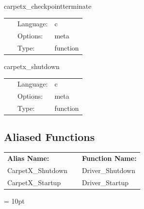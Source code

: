 \vspace{5mm}


\hspace{5mm} carpetx\_checkpointterminate 

\hspace{5mm}{\it checkpoint before terminating } 


\hspace{5mm}

 \begin{tabular*}{160mm}{cll} 
~ & Language:  & c \\ 
~ & Options:  & meta \\ 
~ & Type:  & function \\ 
\end{tabular*} 


\vspace{5mm}


\hspace{5mm} carpetx\_shutdown 

\hspace{5mm}{\it shut down the driver } 


\hspace{5mm}

 \begin{tabular*}{160mm}{cll} 
~ & Language:  & c \\ 
~ & Options:  & meta \\ 
~ & Type:  & function \\ 
\end{tabular*} 


\subsection*{Aliased Functions}

\hspace{5mm}

 \begin{tabular*}{160mm}{ll} 

{\bf Alias Name:} ~~~~~~~ & {\bf Function Name:} \\ 
CarpetX\_Shutdown & Driver\_Shutdown \\ 
CarpetX\_Startup & Driver\_Startup \\ 
\end{tabular*} 



\vspace{5mm}\parskip = 10pt 

